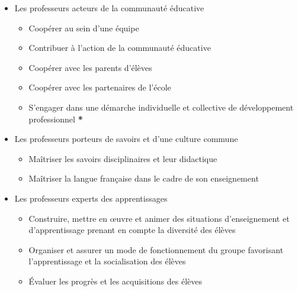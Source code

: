                \begin{itemize}\myItemStyle
                \item Les professeurs acteurs de la communauté éducative
                    \begin{itemize}
                    \item Coopérer au sein d'une équipe
                    \item Contribuer à l'action de la communauté éducative
                    \item Coopérer avec les parents d'élèves
                    \item Coopérer avec les partenaires de l'école
                    \item S'engager dans une démarche individuelle et collective de développement professionnel \textbf{*}
                    \end{itemize}{}
                \item Les professeurs porteurs de savoirs et d'une culture commune
                    \begin{itemize}
                    \item Maîtriser les savoirs disciplinaires et leur didactique
                    \item Maîtriser la langue française dans le cadre de son enseignement
                    \end{itemize}{}
                \item Les professeurs experts des apprentissages
                    \begin{itemize}
                    \item Construire, mettre en œuvre et animer des situations d'enseignement et d'apprentissage prenant en compte la diversité des élèves
                    \item Organiser et assurer un mode de fonctionnement du groupe favorisant l'apprentissage et la socialisation des élèves
                    \item Évaluer les progrès et les acquisitions des élèves
                    \end{itemize}{}
                \end{itemize}{}
